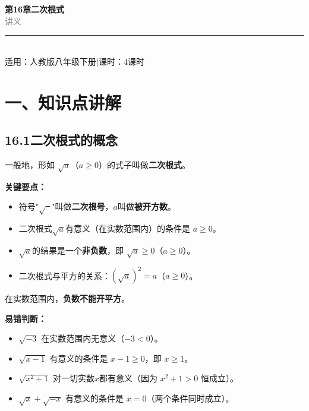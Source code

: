 \documentclass[12pt, a4paper]{ctexart}
\begin{document}
\begin{center}
{\Huge\bfseries\textcolor{mainblue}{第16章\quad 二次根式}}\\[12pt]
{\Large\textcolor{gray}{讲\quad 义}}\\[8pt]
\rule{0.6\textwidth}{1pt}\\[8pt]
{\normalsize 适用：人教版\quad 八年级下册\quad |\quad 课时：4课时}
\end{center}
\vspace{10pt}

\section*{\textcolor{mainblue}{一、知识点讲解}}

\subsection*{16.1\quad 二次根式的概念}

\begin{knowledgebox}[定义：二次根式]
一般地，形如 $\sqrt{a}$（$a \geqslant 0$）的式子叫做\textbf{二次根式}。

\medskip
\textbf{关键要点：}
\begin{itemize}[leftmargin=2em]
  \item 符号"$\sqrt{\phantom{a}}$"叫做\textbf{二次根号}，$a$叫做\textbf{被开方数}。
  \item 二次根式$\sqrt{a}$有意义（在实数范围内）的条件是 $a \geqslant 0$。
  \item $\sqrt{a}$的结果是一个\textbf{非负数}，即 $\sqrt{a} \geqslant 0$（$a \geqslant 0$）。
  \item 二次根式与平方的关系：$(\sqrt{a})^2 = a$（$a \geqslant 0$）。
\end{itemize}
\end{knowledgebox}

\begin{warnbox}
在实数范围内，\textbf{负数不能开平方}。

\medskip
\textbf{易错判断：}
\begin{itemize}[leftmargin=2em]
  \item $\sqrt{-3}$ 在实数范围内无意义（$-3 < 0$）。
  \item $\sqrt{x-1}$ 有意义的条件是 $x - 1 \geqslant 0$，即 $x \geqslant 1$。
  \item $\sqrt{x^2+1}$ 对一切实数$x$都有意义（因为 $x^2 + 1 > 0$ 恒成立）。
  \item $\sqrt{x} + \sqrt{-x}$ 有意义的条件是 $x = 0$（两个条件同时成立）。
\end{itemize}
\end{warnbox}
\end{document}
